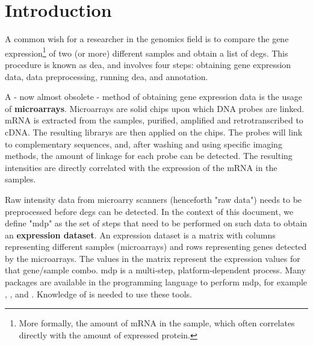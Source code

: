 \newpage



\newpage

\section{Introduction}

A common wish for a researcher in the genomics field is to compare the gene expression\footnote{More formally, the amount of mRNA in the sample, which often correlates directly with the amount of expressed protein.} of two (or more) different samples and obtain a list of \glspl{deg}. This procedure is known as \gls{dea}, and involves four steps: obtaining gene expression data, data preprocessing, running \gls{dea}, and annotation.

A - now almost obsolete - method of obtaining gene expression data is the usage of \textbf{microarrays}. Microarrays are solid chips upon which DNA probes are linked. mRNA is extracted from the samples, purified, amplified and retrotranscribed to cDNA. The resulting \glspl{library} are then applied on the chips. The probes will link to complementary sequences, and, after washing and using specific imaging methods, the amount of linkage for each probe can be detected. The resulting intensities are directly correlated with the expression of the mRNA in the samples.

Raw intensity data from microarry scanners (henceforth "raw data") needs to be preprocessed before \glspl{deg} can be detected. In the context of this document, we define "\gls{mdp}" as the set of steps that need to be performed on such data to obtain an \textbf{expression dataset}. An expression dataset is a matrix with columns representing different samples (microarrays) and rows representing genes detected by the microarrays. The values in the matrix represent the  expression values for that gene/sample combo.
\gls{mdp} is a multi-step, platform-dependent process. Many packages are available in the  programming language to perform \gls{mdp}, for example  \cite{ritchieLimmaPowersDifferential2015}, , and . Knowledge of  is needed to use these tools.

